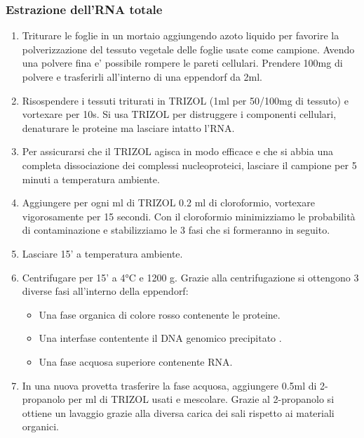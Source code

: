 \subsubsection{Estrazione dell'RNA totale}

\begin{enumerate}
\item Triturare le foglie in un mortaio aggiungendo azoto liquido per favorire la polverizzazione del tessuto vegetale delle foglie usate come campione. Avendo una polvere fina e’ possibile rompere le pareti cellulari. Prendere 100mg di polvere e trasferirli all’interno di una eppendorf da 2ml.

\item Risospendere i tessuti triturati in TRIZOL (1ml per 50/100mg di tessuto) e vortexare per 10s. Si usa TRIZOL per distruggere i componenti cellulari, denaturare le proteine ma lasciare intatto l’RNA.

\item Per assicurarsi che il TRIZOL agisca in modo efficace e che si abbia una completa dissociazione dei complessi nucleoproteici, lasciare il campione per 5 minuti a temperatura ambiente.

\item Aggiungere per ogni ml di TRIZOL 0.2 ml di cloroformio, vortexare vigorosamente per 15 secondi. Con il cloroformio minimizziamo le probabilità di contaminazione e stabilizziamo le 3 fasi che si formeranno in seguito.

\item Lasciare 15’ a temperatura ambiente.

\item Centrifugare per 15’ a 4°C e 1200 g. Grazie alla centrifugazione si ottengono 3 diverse fasi all’interno della eppendorf:
	\begin{itemize}
	\item Una fase organica di colore rosso contenente le proteine.
	\item Una interfase contentente il DNA genomico precipitato	.
	\item Una fase acquosa superiore contenente RNA.
	\end{itemize}

\item In una nuova provetta trasferire la fase acquosa, aggiungere 0.5ml di 2-propanolo per ml di TRIZOL usati e mescolare. Grazie al 2-propanolo si ottiene un lavaggio grazie alla diversa carica dei sali rispetto ai materiali organici.


\end{enumerate}
